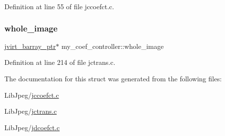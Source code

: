 Definition at line 55 of file jccoefct.\+c.

\mbox{\label{structmy__coef__controller_a7e6db8186140ced6ed561b2860c84819}} 
\subsubsection{\texorpdfstring{whole\_image}{whole\_image}\hspace{0.1cm}{\footnotesize\ttfamily [2/2]}}
{\footnotesize\ttfamily \mbox{\hyperlink{jpeglib_8h_a994f4cba141d82ded90af38e51223f0b}{jvirt\+\_\+barray\+\_\+ptr}}$\ast$ my\+\_\+coef\+\_\+controller\+::whole\+\_\+image}



Definition at line 214 of file jctrans.\+c.



The documentation for this struct was generated from the following files\+:\begin{DoxyCompactItemize}
\item 
Lib\+Jpeg/\mbox{\hyperlink{jccoefct_8c}{jccoefct.\+c}}\item 
Lib\+Jpeg/\mbox{\hyperlink{jctrans_8c}{jctrans.\+c}}\item 
Lib\+Jpeg/\mbox{\hyperlink{jdcoefct_8c}{jdcoefct.\+c}}\end{DoxyCompactItemize}
